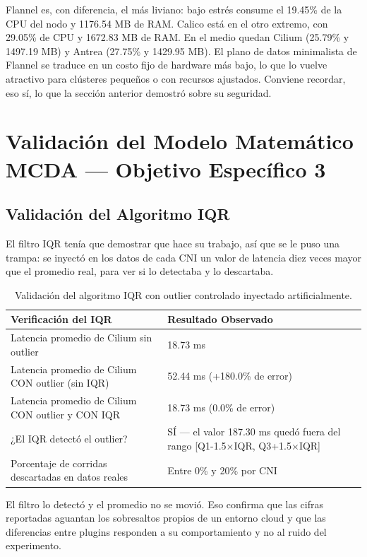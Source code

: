 Flannel es, con diferencia, el más liviano: bajo estrés consume el 19.45\% de la CPU del nodo y 1176.54 MB de RAM. Calico está en el otro extremo, con 29.05\% de CPU y 1672.83 MB de RAM. En el medio quedan Cilium (25.79\% y 1497.19 MB) y Antrea (27.75\% y 1429.95 MB). El plano de datos minimalista de Flannel se traduce en un costo fijo de hardware más bajo, lo que lo vuelve atractivo para clústeres pequeños o con recursos ajustados. Conviene recordar, eso sí, lo que la sección anterior demostró sobre su seguridad.

\section{Validación del Modelo Matemático MCDA --- Objetivo Específico 3}

\subsection{Validación del Algoritmo IQR}

El filtro IQR tenía que demostrar que hace su trabajo, así que se le puso una trampa: se inyectó en los datos de cada CNI un valor de latencia diez veces mayor que el promedio real, para ver si lo detectaba y lo descartaba.

\begin{table}[htbp]
\centering
\scriptsize
\caption{Validación del algoritmo IQR con outlier controlado inyectado artificialmente.}
\label{tab:iqr-validacion}
\begin{tabularx}{\textwidth}{|Y|Y|}
\hline
\textbf{Verificación del IQR} & \textbf{Resultado Observado} \\
\hline
Latencia promedio de Cilium sin outlier & 18.73 ms \\
\hline
Latencia promedio de Cilium CON outlier (sin IQR) & 52.44 ms (+180.0\% de error) \\
\hline
Latencia promedio de Cilium CON outlier y CON IQR & 18.73 ms (0.0\% de error) \\
\hline
¿El IQR detectó el outlier? & SÍ --- el valor 187.30 ms quedó fuera del rango [Q1-1.5$\times$IQR, Q3+1.5$\times$IQR] \\
\hline
Porcentaje de corridas descartadas en datos reales & Entre 0\% y 20\% por CNI \\
\hline
\end{tabularx}
\end{table}

El filtro lo detectó y el promedio no se movió. Eso confirma que las cifras reportadas aguantan los sobresaltos propios de un entorno cloud y que las diferencias entre plugins responden a su comportamiento y no al ruido del experimento.

